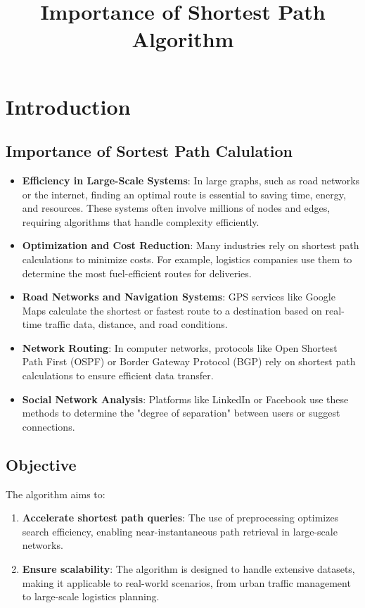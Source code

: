 \chapter{Introduction}

\title{Importance of Shortest Path Algorithm}

	\section{Importance of Sortest Path Calulation}
	\begin{itemize}
		\item \textbf{Efficiency in Large-Scale Systems}: In large graphs, such as road networks or the internet, finding an optimal route is essential to saving time, energy, and resources. These systems often involve millions of nodes and edges, requiring algorithms that handle complexity efficiently.
		\item \textbf{Optimization and Cost Reduction}: Many industries rely on shortest path calculations to minimize costs. For example, logistics companies use them to determine the most fuel-efficient routes for deliveries.
		\item \textbf{Road Networks and Navigation Systems}: GPS services like Google Maps calculate the shortest or fastest route to a destination based on real-time traffic data, distance, and road conditions.
		\item \textbf{Network Routing}: In computer networks, protocols like Open Shortest Path First (OSPF) or Border Gateway Protocol (BGP) rely on shortest path calculations to ensure efficient data transfer.
		\item \textbf{Social Network Analysis}: Platforms like LinkedIn or Facebook use these methods to determine the "degree of separation" between users or suggest connections.
	\end{itemize}
    \clearpage

	\section{Objective}
	The algorithm aims to:
	\begin{enumerate}
		\item \textbf{Accelerate shortest path queries}: The use of preprocessing optimizes search efficiency, enabling near-instantaneous path retrieval in large-scale networks.
		\item \textbf{Ensure scalability}: The algorithm is designed to handle extensive datasets, making it applicable to real-world scenarios, from urban traffic management to large-scale logistics planning.
	\end{enumerate}
	
